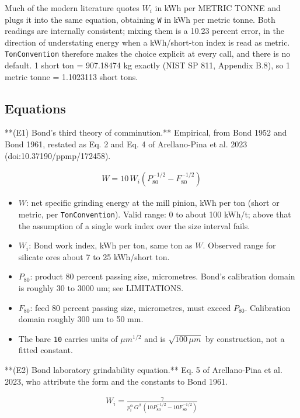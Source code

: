 \documentclass[10pt,a4paper,twoside]{report}
\begin{document}
Much of the modern literature quotes $W_i$ in kWh per METRIC TONNE and plugs it into the same equation, obtaining \texttt{W} in kWh per metric tonne. Both readings are internally consistent; mixing them is a 10.23 percent error, in the direction of understating energy when a kWh/short-ton index is read as metric. \texttt{TonConvention} therefore makes the choice explicit at every call, and there is no default. 1 short ton = 907.18474 kg exactly (NIST SP 811, Appendix B.8), so 1 metric tonne = 1.1023113 short tons.

\subsection*{Equations}

**(E1) Bond's third theory of comminution.** Empirical, from Bond 1952 and Bond 1961, restated as Eq. 2 and Eq. 4 of Arellano-Pina et al. 2023 (doi:10.37190/ppmp/172458).

\begin{equation*}
\begin{gathered}
W = 10\, W_i \left( P_{80}^{-1/2} - F_{80}^{-1/2} \right)
\end{gathered}
\end{equation*}

\begin{itemize}
\item $W$: net specific grinding energy at the mill pinion, kWh per ton (short or metric, per \texttt{TonConvention}). Valid range: 0 to about 100 kWh/t; above that the assumption of a single work index over the size interval fails.
\item $W_i$: Bond work index, kWh per ton, same ton as $W$. Observed range for silicate ores about 7 to 25 kWh/short ton.
\item $P_{80}$: product 80 percent passing size, micrometres. Bond's calibration domain is roughly 30 to 3000 um; see LIMITATIONS.
\item $F_{80}$: feed 80 percent passing size, micrometres, must exceed $P_{80}$. Calibration domain roughly 300 um to 50 mm.
\item The bare \texttt{10} carries units of $\mu m^{1/2}$ and is $\sqrt{100\,\mu m}$ by construction, not a fitted constant.
\end{itemize}

**(E2) Bond laboratory grindability equation.** Eq. 5 of Arellano-Pina et al. 2023, who attribute the form and the constants to Bond 1961.

\begin{equation*}
\begin{gathered}
W_i = \frac{\gamma}{p_i^{\alpha}\, G^{\beta}\, \left( 10 P_{80}^{-1/2} - 10 F_{80}^{-1/2} \right)}
\end{gathered}
\end{equation*}
\end{document}
